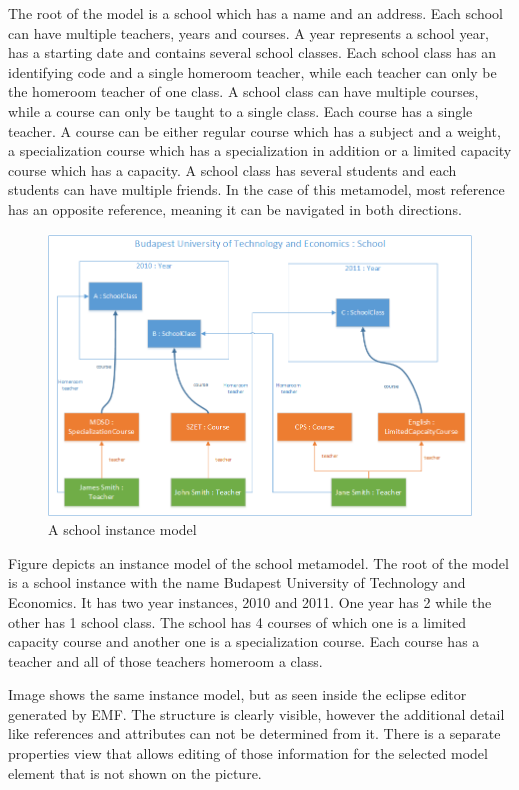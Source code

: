The root of the model is a school which has a name and an address. Each school
can have multiple teachers, years and courses. A year represents a school year,
has a starting date and contains several school classes. Each school class
has an identifying code and a single homeroom teacher, while each teacher can
only be the homeroom teacher of one class. A school class can have multiple
courses, while a course can only be taught to a single class. Each course has a
single teacher. A course can be either regular course which has a subject and a
weight, a specialization course which has a specialization in addition or a
limited capacity course which has a capacity. A school class has several
students and each students can have multiple friends. In the case of this
metamodel, most reference has an opposite reference, meaning it can be navigated in both directions.

\begin{figure}[!ht]
\centering
\includegraphics[width=133mm,keepaspectratio]{figures/InstanceModel.png}
\caption{A school instance model}
\label{fig:InstanceModel}
\end{figure}

Figure  depicts an instance model of the school metamodel.
The root of the model is a school instance with the name Budapest University of
Technology and Economics. It has two year instances, 2010 and 2011.
One year has 2 while the other has 1 school class. The school has 4 courses of
which one is a limited capacity course and another one is a specialization
course. Each course has a teacher and all of those teachers homeroom a class.

\pagebreak

Image  shows the same instance model, but as seen
inside the eclipse editor generated by EMF. The structure is clearly visible,
however the additional detail like references and attributes can not be
determined from it. There is a separate properties view that allows editing of
those information for the selected model element that is not shown on the
picture.


